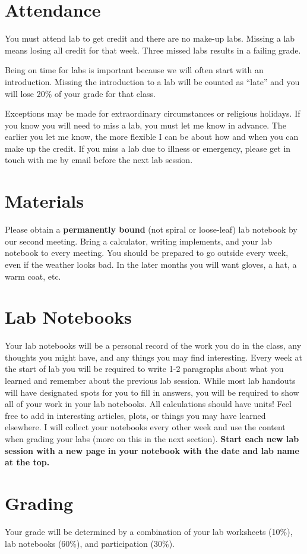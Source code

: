 \documentclass[12pt]{article}
\begin{document}
\section*{Attendance}
You must attend lab to get credit and there are no make-up labs. Missing a lab means losing all credit for that week. Three missed labs results in a failing grade.

Being on time for labs is important because we will often start with an introduction. Missing the introduction to a lab will be counted as ``late'' and you will lose 20\% of your grade for that class.

Exceptions may be made for extraordinary circumstances or religious holidays. If you know you will need to miss a lab, you must let me know in advance. The earlier you let me know, the more flexible I can be about how and when you can make up the credit. If you miss a lab due to illness or emergency, please get in touch with me by email before the next lab session.

\section*{Materials}
Please obtain a \textbf{permanently bound} (not spiral or loose-leaf) lab notebook by our second meeting. Bring a calculator, writing implements, and your lab notebook to every meeting. You should be prepared to go outside every week, even if the weather looks bad. In the later months you will want gloves, a hat, a warm coat, etc. 

\section*{Lab Notebooks}
Your lab notebooks will be a personal record of the work you do in the class, any thoughts you might have, and any things you may find interesting. Every week at the start of lab you will be required to write 1-2 paragraphs about what you learned and remember about the previous lab session. While most lab handouts will have designated spots for you to fill in answers, you will be required to show all of your work in your lab notebooks. All calculations should have units! Feel free to add in interesting articles, plots, or things you may have learned elsewhere. I will collect your notebooks every other week and use the content when grading your labs (more on this in the next section). \textbf{Start each new lab session with a new page in your notebook with the date and lab name at the top.}

\section*{Grading}
Your grade will be determined by a combination of your lab worksheets (10\%), lab notebooks (60\%), and participation (30\%). 
\end{document}
